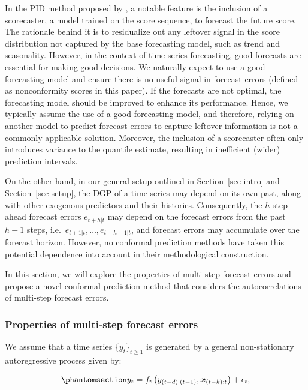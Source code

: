 \documentclass[
  11pt,
  a4paper,
]{article}
\theoremstyle{plain}
\theoremstyle{plain}
\theoremstyle{remark}
\begin{document}
In the PID method proposed by \textcite{angelopoulos2024}, a notable
feature is the inclusion of a scorecaster, a model trained on the score
sequence, to forecast the future score. The rationale behind it is to
residualize out any leftover signal in the score distribution not
captured by the base forecasting model, such as trend and seasonality.
However, in the context of time series forecasting, good forecasts are
essential for making good decisions. We naturally expect to use a good
forecasting model and ensure there is no useful signal in forecast
errors (defined as nonconformity scores in this paper). If the forecasts
are not optimal, the forecasting model should be improved to enhance its
performance. Hence, we typically assume the use of a good forecasting
model, and therefore, relying on another model to predict forecast
errors to capture leftover information is not a commonly applicable
solution. Moreover, the inclusion of a scorecaster often only introduces
variance to the quantile estimate, resulting in inefficient (wider)
prediction intervals.

On the other hand, in our general setup outlined in
Section~\ref{sec-intro} and Section~\ref{sec-setup}, the DGP of a time
series may depend on its own past, along with other exogenous predictors
and their histories. Consequently, the \(h\)-step-ahead forecast errors
\(e_{t+h|t}\) may depend on the forecast errors from the past \(h-1\)
steps, i.e.~\(e_{t+1|t}, \ldots, e_{t+h-1|t}\), and forecast errors may
accumulate over the forecast horizon. However, no conformal prediction
methods have taken this potential dependence into account in their
methodological construction.

In this section, we will explore the properties of multi-step forecast
errors and propose a novel conformal prediction method that considers
the autocorrelations of multi-step forecast errors.

\subsubsection{Properties of multi-step forecast errors}\label{sec-ppt}

We assume that a time series \(\{y_t\}_{t \geq 1}\) is generated by a
general non-stationary autoregressive process given by:

\begin{equation}\phantomsection\label{eq-dgp}{
y_t = f_{t}\left(y_{(t-d):(t-1)},\bm{x}_{(t-k):t}\right) + \epsilon_t,
}\end{equation}
\end{document}
